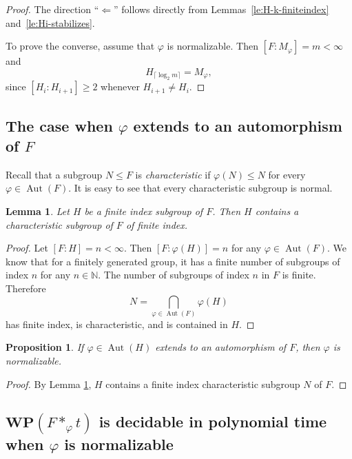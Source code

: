 \documentclass[12pt,oneside]{amsart}
\newtheorem{lemma}[theorem]{Lemma}
\newtheorem{proposition}[theorem]{Proposition}
\theoremstyle{definition}
\theoremstyle{case}
\def\WP{{\mathbf{WP}}}
\def\MN{{\mathbb{N}}}
\DeclareMathOperator{\Aut}{{Aut}}
\begin{document}
\begin{proof}
The direction ``$\Leftarrow$'' follows directly from
Lemmas~\ref{le:H-k-finiteindex} and~\ref{le:Hi-stabilizes}.

To prove the converse, assume that $\varphi$ is normalizable.
Then $[F : M_\varphi] = m < \infty$ and
\[
H_{\lceil \log_2 m \rceil} = M_\varphi,
\]
since $[H_i : H_{i+1}] \ge 2$ whenever $H_{i+1} \neq H_i$.
\end{proof}


\subsection{The case when $\varphi$ extends to an automorphism of $F$}

Recall that a subgroup  $N\le F$ is \emph{characteristic} if 
$\varphi(N)\leq N$ for every $\varphi \in \Aut(F)$. 
It is easy to see that every characteristic subgroup is normal.


\begin{lemma}\label{le:characteristic}
Let $H$ be a finite index subgroup of $F$.
Then $H$ contains a characteristic subgroup of $F$ of finite index.
\end{lemma}

\begin{proof}
Let $[F:H] = n <\infty$. Then $[F:\varphi(H)] = n$ for any $\varphi\in\Aut(F)$. We know that for a finitely generated group, it has a finite number of subgroups of index $n$
 for any $n\in\MN$.
The number of subgroups of index $n$ in $F$ is finite.
Therefore
$$
N = \bigcap_{\varphi\in\Aut(F)} \varphi(H)
$$
has finite index, is characteristic, and is contained in $H$.
\end{proof}



\begin{proposition}
If $\varphi\in\Aut(H)$ extends to an automorphism of $F$, 
then $\varphi$ is normalizable.
\end{proposition}

\begin{proof}
By Lemma \ref{le:characteristic}, $H$ contains 
a finite index characteristic subgroup $N$ of $F$.
\end{proof}

\subsection{$\WP(F\ast_\varphi t)$ is decidable in polynomial time when $\varphi$ is normalizable}
\end{document}
